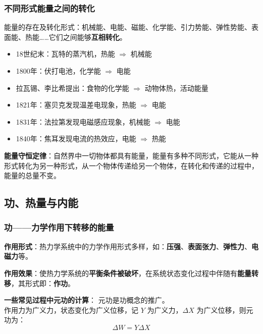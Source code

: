 \documentclass[UTF8]{ctexart}
\theoremstyle{definition}
\begin{document}
\subsubsection*{不同形式能量之间的转化}

能量的存在及转化形式：机械能、电能、磁能、化学能、引力势能、弹性势能、表面能、热能……它们之间能够\textbf{互相转化}。

\begin{itemize}
    \item 18世纪末：瓦特的蒸汽机，热能 $\Rightarrow$ 机械能
    \item 1800年：伏打电池，化学能 $\Rightarrow$ 电能
    \item 拉瓦锡、李比希提出：食物的化学能 $\Rightarrow$ 动物体热，活动能量
    \item 1821年：塞贝克发现温差电现象，热能 $\Rightarrow$ 电能
    \item 1831年：法拉第发现电磁感应现象，机械能 $\Rightarrow$ 电能
    \item 1840年：焦耳发现电流的热效应，电能 $\Rightarrow$ 热能
\end{itemize}

\textbf{能量守恒定律}：自然界中一切物体都具有能量，能量有多种不同形式，它能从一种形式转化为另一种形式，从一个物体传递给另一个物体，在转化和传递的过程中，能量的总量不变。

\subsection{功、热量与内能}

\subsubsection*{功——力学作用下转移的能量}

\textbf{作用形式}：热力学系统中的力学作用形式多样，如：\textbf{压强}、\textbf{表面张力}、\textbf{弹性力}、\textbf{电磁力}等。

\textbf{作用效果}：使热力学系统的\textbf{平衡条件被破坏}，在系统状态变化过程中伴随有\textbf{能量转移}，其形式即：\textbf{作功}。

\textbf{一些常见过程中元功的计算}：
元功是功概念的推广。\\
作用力为广义力，状态变化为广义位移，记 $Y$ 为广义力，$\Delta X$ 为广义位移，则元功为：
\begin{equation}
\Delta W = Y\Delta X
\end{equation}
\end{document}

